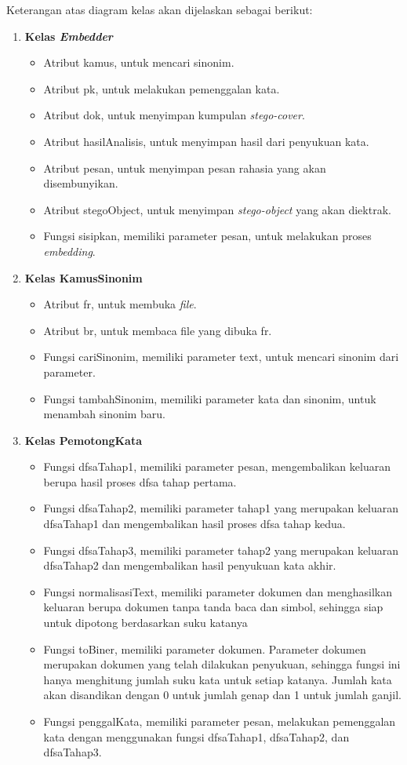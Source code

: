 Keterangan atas diagram kelas akan dijelaskan sebagai berikut:

\begin{enumerate}
	\item \textbf{Kelas \textit{Embedder}}
	\begin{itemize}
		\item Atribut kamus, untuk mencari sinonim.
		\item Atribut pk, untuk melakukan pemenggalan kata.
		\item Atribut dok, untuk menyimpan kumpulan \textit{stego-cover}.
		\item Atribut hasilAnalisis, untuk menyimpan hasil dari penyukuan kata.
		\item Atribut pesan, untuk menyimpan pesan rahasia yang akan disembunyikan.
		\item Atribut stegoObject, untuk menyimpan \textit{stego-object} yang akan diektrak.
		\item Fungsi sisipkan, memiliki parameter pesan, untuk melakukan proses \textit{embedding}.
	\end{itemize}

	\item \textbf{Kelas KamusSinonim}
	\begin{itemize}
		\item Atribut fr, untuk membuka \textit{file}.
		\item Atribut br, untuk membaca file yang dibuka fr.
		\item Fungsi cariSinonim, memiliki parameter text, untuk mencari sinonim dari parameter.
		\item Fungsi tambahSinonim, memiliki parameter kata dan sinonim, untuk menambah sinonim baru.
	\end{itemize}

	\item \textbf{Kelas PemotongKata}
	\begin{itemize}
		\item Fungsi dfsaTahap1, memiliki parameter pesan, mengembalikan keluaran berupa hasil proses dfsa tahap pertama.
		\item Fungsi dfsaTahap2, memiliki parameter tahap1 yang merupakan keluaran dfsaTahap1 dan mengembalikan hasil proses dfsa tahap kedua.
		\item Fungsi dfsaTahap3, memiliki parameter tahap2 yang merupakan keluaran dfsaTahap2 dan mengembalikan hasil penyukuan kata akhir.
		\item Fungsi normalisasiText, memiliki parameter dokumen dan menghasilkan keluaran berupa dokumen tanpa tanda baca dan simbol, sehingga siap untuk dipotong berdasarkan suku katanya
		\item Fungsi toBiner, memiliki parameter dokumen. Parameter dokumen merupakan dokumen yang telah dilakukan penyukuan, sehingga fungsi ini hanya menghitung jumlah suku kata untuk setiap katanya. Jumlah kata akan disandikan dengan 0 untuk jumlah genap dan 1 untuk jumlah ganjil.
		\item Fungsi penggalKata, memiliki parameter pesan, melakukan pemenggalan kata dengan menggunakan fungsi dfsaTahap1, dfsaTahap2, dan dfsaTahap3.
	\end{itemize}
	

\end{enumerate}
